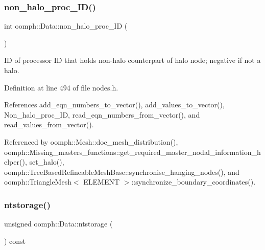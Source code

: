 \mbox{\label{classoomph_1_1Data_ae8ef6f90c536b83bd393dbc87920741e}} 
\subsubsection{\texorpdfstring{non\+\_\+halo\+\_\+proc\+\_\+\+I\+D()}{non\_halo\_proc\_ID()}}
{\footnotesize\ttfamily int oomph\+::\+Data\+::non\+\_\+halo\+\_\+proc\+\_\+\+ID (\begin{DoxyParamCaption}{ }\end{DoxyParamCaption})\hspace{0.3cm}{\ttfamily [inline]}}



ID of processor ID that holds non-\/halo counterpart of halo node; negative if not a halo. 



Definition at line 494 of file nodes.\+h.



References add\+\_\+eqn\+\_\+numbers\+\_\+to\+\_\+vector(), add\+\_\+values\+\_\+to\+\_\+vector(), Non\+\_\+halo\+\_\+proc\+\_\+\+ID, read\+\_\+eqn\+\_\+numbers\+\_\+from\+\_\+vector(), and read\+\_\+values\+\_\+from\+\_\+vector().



Referenced by oomph\+::\+Mesh\+::doc\+\_\+mesh\+\_\+distribution(), oomph\+::\+Missing\+\_\+masters\+\_\+functions\+::get\+\_\+required\+\_\+master\+\_\+nodal\+\_\+information\+\_\+helper(), set\+\_\+halo(), oomph\+::\+Tree\+Based\+Refineable\+Mesh\+Base\+::synchronise\+\_\+hanging\+\_\+nodes(), and oomph\+::\+Triangle\+Mesh$<$ E\+L\+E\+M\+E\+N\+T $>$\+::synchronize\+\_\+boundary\+\_\+coordinates().

\mbox{\label{classoomph_1_1Data_a9752205c5fb3bb886200b3fae9181e94}} 
\subsubsection{\texorpdfstring{ntstorage()}{ntstorage()}}
{\footnotesize\ttfamily unsigned oomph\+::\+Data\+::ntstorage (\begin{DoxyParamCaption}{ }\end{DoxyParamCaption}) const}



